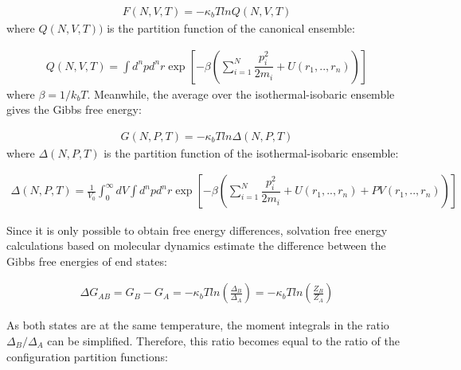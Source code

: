 \begin{equation}
\label{eq:fcano}
\begin{aligned}
F(N,V,T) = -\kappa_{b}T ln Q(N,V,T)
\end{aligned}
\end{equation}
where $Q(N,V,T))$ is the partition function of the canonical ensemble:

\begin{equation}
\label{eq:partican}
\begin{aligned}
Q(N,V,T) = \int d^{n}p d^{n}r \exp \left[ -\beta \left( \sum_{i=1}^{N}\dfrac{p_{i}^{2}}{2m_{i}} + U(r_{1},..,r_{n}) \right)
\right]
\end{aligned}
\end{equation}
where $\beta=1/k_{b}T$. Meanwhile, the average over the isothermal-isobaric ensemble gives the Gibbs free energy:

\begin{equation}
\label{eq:fisobari}
\begin{aligned}
G(N,P,T) = -\kappa_{b}T ln \Delta (N,P,T)
\end{aligned}
\end{equation}
where $\Delta (N,P,T)$ is the partition function of the isothermal-isobaric ensemble:

\begin{equation}
\label{eq:partiso}
\begin{aligned}
\Delta (N,P,T) = \frac{1}{V_{0}} \int_{0}^{\infty} dV \int d^{n}p d^{n}r \exp \left[ -\beta \left( \sum_{i=1}^{N}\dfrac{p_{i}^{2}}{2m_{i}} + U(r_{1},..,r_{n}) + PV(r_{1},..,r_{n}) \right) \right]
\end{aligned}
\end{equation}

Since it is only possible to obtain free energy differences, solvation free energy calculations based on molecular dynamics estimate the difference between the Gibbs free energies of end states:

\begin{equation}
\label{eq:dif}
\begin{aligned}
\Delta G_{AB} = G_{B} - G_{A}= -\kappa_{b}T ln \left( \frac{\Delta_{B}}{\Delta_{A}}\right) = -\kappa_{b}T ln \left( \frac{Z_{B}}{Z_{A}}\right)
\end{aligned}
\end{equation}

As both states are at the same temperature, the moment integrals in the ratio ${\Delta_{B}}/{\Delta_{A}}$ can be simplified. Therefore, this ratio becomes equal to the ratio of the configuration partition functions:

